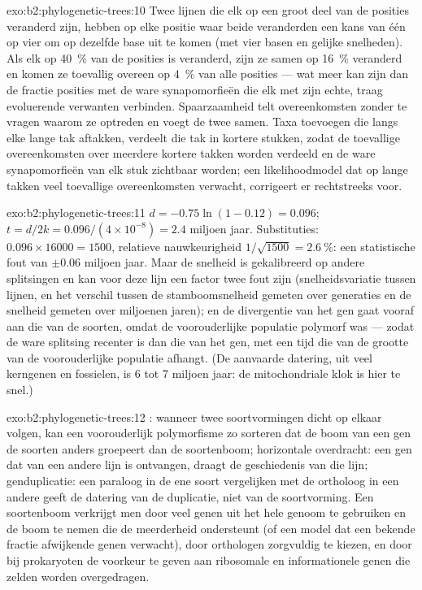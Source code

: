 \begin{solution}{exo:b2:phylogenetic-trees:10}
Twee lijnen die elk op een groot deel van de posities veranderd zijn, hebben
op elke positie waar beide veranderden een kans van één op vier om op dezelfde
base uit te komen (met vier basen en gelijke snelheden). Als elk op
\qty{40}{\%} van de posities is veranderd, zijn ze samen op
\qty{16}{\%} veranderd en komen ze toevallig overeen op \qty{4}{\%} van alle
posities --- wat meer kan zijn dan de fractie posities met de ware
synapomorfieën die elk met zijn echte, traag evoluerende verwanten verbinden.
Spaarzaamheid telt overeenkomsten zonder te vragen waarom ze optreden
en voegt de twee samen. Taxa toevoegen die langs elke lange tak aftakken,
verdeelt die tak in kortere stukken, zodat de toevallige overeenkomsten over
meerdere kortere takken worden verdeeld en de ware synapomorfieën van elk
stuk zichtbaar worden; een likelihoodmodel dat op lange takken veel toevallige
overeenkomsten verwacht, corrigeert er rechtstreeks voor.
\end{solution}

\begin{solution}{exo:b2:phylogenetic-trees:11}
$d = -0.75\ln(1 - 0.12) = 0.096$; $t = d/2k = 0.096/(4\times 10^{-8})
= 2.4$ miljoen jaar. Substituties: $0.096\times \num{16000} =
1500$, relatieve nauwkeurigheid $1/\sqrt{1500} = \qty{2.6}{\%}$: een
statistische fout van $\pm 0.06$ miljoen jaar. Maar de snelheid is
gekalibreerd op andere splitsingen en kan voor deze lijn een factor twee fout
zijn (snelheidsvariatie tussen lijnen, en het verschil tussen de
stamboomsnelheid gemeten over generaties en de snelheid gemeten over miljoenen
jaren); en de divergentie van het gen gaat vooraf aan die van de soorten,
omdat de voorouderlijke populatie polymorf was --- zodat de ware splitsing
recenter is dan die van het gen, met een tijd die van de grootte van de
voorouderlijke populatie afhangt. (De aanvaarde datering, uit veel kerngenen en
fossielen, is 6 tot 7 miljoen jaar: de mitochondriale klok is hier te
snel.)
\end{solution}

\begin{solution}{exo:b2:phylogenetic-trees:12}
: wanneer twee soortvormingen dicht op elkaar volgen,
kan een voorouderlijk polymorfisme zo sorteren dat de boom van een gen de
soorten anders groepeert dan de soortenboom; horizontale overdracht: een gen
dat van een andere lijn is ontvangen, draagt de geschiedenis van die lijn;
genduplicatie: een paraloog in de ene soort vergelijken met de ortholoog in
een andere geeft de datering van de duplicatie, niet van de soortvorming. Een
soortenboom verkrijgt men door veel genen uit het hele genoom te gebruiken en
de boom te nemen die de meerderheid ondersteunt (of een model dat een bekende
fractie afwijkende genen verwacht), door orthologen zorgvuldig te kiezen, en
door bij prokaryoten de voorkeur te geven aan ribosomale en informationele
genen die zelden worden overgedragen.
\end{solution}

